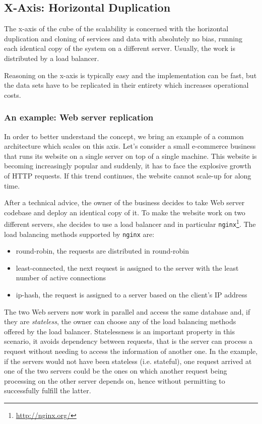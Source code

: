 \subsection{X-Axis: Horizontal Duplication}
\label{sec:x-axis}

The x-axis of the cube of the scalability is concerned with the horizontal
duplication and cloning of services and data with absolutely no bias, running
each identical copy of the system on a different server. Usually, the work is
distributed by a load balancer.

Reasoning on the x-axis is typically easy and the implementation can be fast,
but the data sets have to be replicated in their entirety which increases
operational costs.

\subsubsection{An example: Web server replication}
In order to better understand the concept, we bring an example of a common
architecture which scales on this axis. Let's consider a small e-commerce
business that runs its website on a single server on top of a single machine.
This website is becoming increasingly popular and suddenly, it has to face the
explosive growth of HTTP requests. If this trend continues, the website cannot
scale-up for along time.

After a technical advice, the owner of the business decides to take Web server 
codebase and deploy an identical copy of it. To make the website work on two
different servers, she decides to use a load balancer and in particular
\texttt{nginx}\footnote{\url{http://nginx.org/}}. The load balancing methods 
supported by \texttt{nginx} are:

\begin{itemize}
  \item round-robin, the requests are distributed in round-robin
  \item least-connected, the next request is assigned to the server with the
  least number of active connections
  \item ip-hash, the request is assigned to a server based on the client's IP
  address
\end{itemize}

The two Web servers now work in parallel and access the same database and,
if they are \emph{stateless}, the owner can choose any of the load 
balancing methods offered by the load balancer. Statelessness is an important
property in this scenario, it avoids dependency between requests, that is the
server can process a request without needing to access the information of
another one. In the example, if the servers would not have been stateless (i.e.
stateful), one request arrived at one of the two servers could be the ones
on which another request being processing on the other server depends on, hence
without permitting to successfully fulfill the latter.


